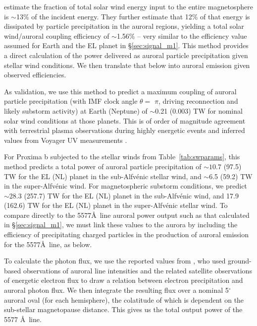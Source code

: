 \documentclass{emulateapj}
\begin{document}
\citet{Wang2014} estimate the fraction of total solar wind energy input to the entire magnetosphere is $\sim$13\% of the incident energy. They further estimate that 12\% of that energy is dissipated by particle precipitation in the auroral regions, yielding a total solar wind/auroral coupling efficiency of $\sim$1.56\% -- very similar to the efficiency value assumed for Earth and the EL planet in \S\ref{sec:signal_m1}. This method provides a direct calculation of the power delivered as auroral particle precipitation given stellar wind conditions. We then translate that below into auroral emission given observed efficiencies.

As validation, we use this method to predict a maximum coupling of auroral particle precipitation (with IMF clock angle $\theta =$ $\pi$, driving reconnection and likely substorm activity) at Earth (Neptune) of $\sim$0.21 (0.003) TW for nominal solar wind conditions at those planets. This is of order of magnitude agreement with terrestrial plasma observations during highly energetic events \citep[e.g.][]{Hubert2002} and inferred values from Voyager UV measurements \citep[e.g.][]{Sandel1990,Mauk1994}. 

For Proxima b subjected to the stellar winds from Table~\ref{tab:swparams}, this method predicts a total power of auroral particle precipitation of ${\sim} 10.7$ (97.5) TW for the EL (NL) planet in the sub-Alfv\'{e}nic stellar wind, and $\sim$6.5 (59.2) TW in the super-Alfv\'{e}nic wind. For magnetospheric substorm conditions, we predict $\sim$28.3 (257.7) TW for the EL (NL) planet in the sub-Alfv\'{e}nic wind, and 17.9 (162.6) TW for the EL (NL) planet in the super-Alfv\'{e}nic stellar wind. To compare directly to the 5577\AA\ line auroral power output such as that calculated in \S\ref{sec:signal_m1}, we must link these values to the aurora by including the efficiency of precipitating charged particles in the production of auroral emission for the 5577\AA\ line, as below.


To calculate the photon flux, we use the reported values from \citet{Steele1990}, who used ground-based observations of auroral line intensities and the related satellite observations of energetic electron flux to draw a relation between electron precipitation and auroral photon flux. We then integrate the resulting flux over a nominal 5$^\circ$ auroral oval (for each hemisphere), the colatitude of which is dependent on the sub-stellar magnetopause distance. This gives us the total output power of the 5577 \AA\ line.
\end{document}
